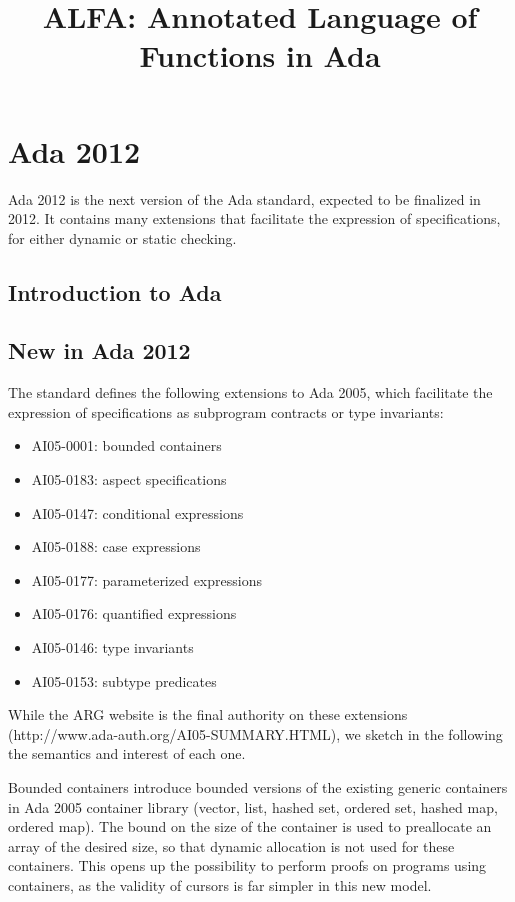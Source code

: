 \documentclass{article}
\title{ALFA: Annotated Language of Functions in Ada}
\begin{document}
\maketitle
\sloppy
\section{Ada 2012}

Ada 2012 is the next version of the Ada standard, expected to be finalized in
2012. It contains many extensions that facilitate the expression of
specifications, for either dynamic or static checking.

\subsection{Introduction to Ada}

\subsection{New in Ada 2012}

The standard defines the following extensions to Ada 2005, which facilitate the
expression of specifications as subprogram contracts or type invariants:

\begin{itemize}
\item AI05-0001: bounded containers
\item AI05-0183: aspect specifications
\item AI05-0147: conditional expressions
\item AI05-0188: case expressions
\item AI05-0177: parameterized expressions
\item AI05-0176: quantified expressions
\item AI05-0146: type invariants
\item AI05-0153: subtype predicates
\end{itemize}

While the ARG website is the final authority on these extensions
(http://www.ada-auth.org/AI05-SUMMARY.HTML), we sketch in the following the
semantics and interest of each one.

Bounded containers introduce bounded versions of the existing generic
containers in Ada 2005 container library (vector, list, hashed set, ordered
set, hashed map, ordered map). The bound on the size of the container is used
to preallocate an array of the desired size, so that dynamic allocation is not
used for these containers. This opens up the possibility to perform proofs on
programs using containers, as the validity of cursors is far simpler in this
new model.
\end{document}
